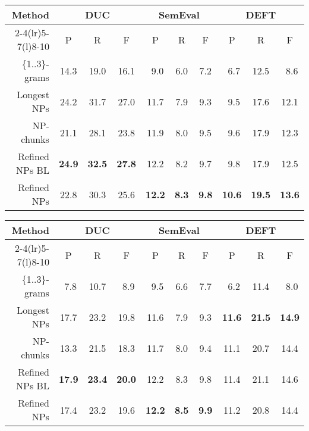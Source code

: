       \begin{table*}
        \centering
        \begin{tabular}{@{}rccccccccc@{}}
          \toprule
          \multirow{2}{*}[-2pt]{\textbf{Method}} & \multicolumn{3}{c}{\textbf{DUC}} & \multicolumn{3}{c}{\textbf{SemEval}} & \multicolumn{3}{c}{\textbf{DEFT}}\\
          \cmidrule(r){2-4}\cmidrule(lr){5-7}\cmidrule(l){8-10}
          & P & R & F & P & R & F & P & R & F\\
          \midrule
          \{1..3\}-grams & 14.3 & 19.0 & 16.1 & $~~$9.0 & $~~$6.0 & $~~$7.2 & $~~$6.7 & 12.5 & $~~$8.6\\
          Longest NPs & 24.2 & 31.7 & 27.0 & 11.7 & $~~$7.9 & $~~$9.3 & $~~$9.5 & 17.6 & 12.1\\
          NP-chunks & 21.1 & 28.1 & 23.8 & 11.9 & $~~$8.0 & $~~$9.5 & $~~$9.6 & 17.9 & 12.3\\
          Refined NPs BL & \textbf{24.9} & \textbf{32.5} & \textbf{27.8} & 12.2 & $~~$8.2 & $~~$9.7 & $~~$9.8 & 17.9 & 12.5\\
          Refined NPs & 22.8 & 30.3 & 25.6 & \textbf{12.2} & \textbf{$~~$8.3} & \textbf{$~~$9.8} & \textbf{10.6} & \textbf{19.5} & \textbf{13.6}\\
          \bottomrule
        \end{tabular}
        \caption{Comparison of candidate selection methods, when 10 keyphrases
                 are extracted by \textbf{TF-IDF}.
                 \label{tab:tfidf_results}}
      \end{table*}
      \begin{table*}
        \centering
        \begin{tabular}{@{}rccccccccc@{}}
          \toprule
          \multirow{2}{*}[-2pt]{\textbf{Method}} & \multicolumn{3}{c}{\textbf{DUC}} & \multicolumn{3}{c}{\textbf{SemEval}} & \multicolumn{3}{c}{\textbf{DEFT}}\\
          \cmidrule(r){2-4}\cmidrule(lr){5-7}\cmidrule(l){8-10}
          & P & R & F & P & R & F & P & R & F\\
          \midrule
          \{1..3\}-grams & $~~$7.8 & 10.7 & $~~$8.9 & $~~$9.5 & $~~$6.6 & $~~$7.7 & $~~$6.2 & 11.4 & $~~$8.0\\
          Longest NPs & 17.7 & 23.2 & 19.8 & 11.6 & $~~$7.9 & $~~$9.3 & \textbf{11.6} & \textbf{21.5} & \textbf{14.9}\\
          NP-chunks & 13.3 & 21.5 & 18.3 & 11.7 & $~~$8.0 & $~~$9.4 & 11.1 & 20.7 & 14.4\\
          Refined NPs BL & \textbf{17.9} & \textbf{23.4} & \textbf{20.0} & 12.2 & $~~$8.3 & $~~$9.8 & 11.4 & 21.1 & 14.6\\
          Refined NPs & 17.4 & 23.2 & 19.6 & \textbf{12.2} & \textbf{$~~$8.5} & \textbf{$~~$9.9} & 11.2 & 20.8 & 14.4\\
          \bottomrule
        \end{tabular}
        \caption{Comparison of candidate selection methods, when 10 keyphrases
                 are extracted by \textbf{TopicRank}.
                 \label{tab:topicrank_results}}
      \end{table*}
